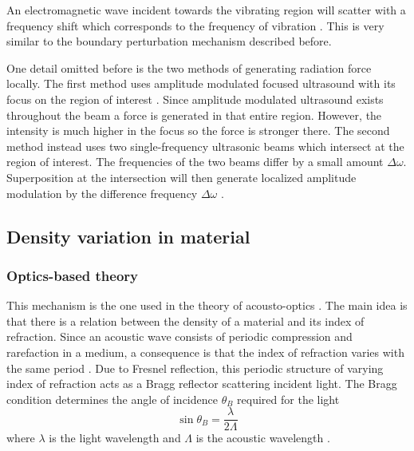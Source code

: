 \documentclass[10pt,a4paper,draft]{scrartcl}
\begin{document}
	An electromagnetic wave incident towards the vibrating region will scatter with a frequency shift which corresponds to the frequency of vibration \cite{Top2014}. This is very similar to the boundary perturbation mechanism described before.
	
	One detail omitted before is the two methods of generating radiation force locally. The first method uses amplitude modulated focused ultrasound with its focus on the region of interest \cite{Top2016}. Since amplitude modulated ultrasound exists throughout the beam a force is generated in that entire region. However, the intensity is much higher in the focus so the force is stronger there. The second method instead uses two single-frequency ultrasonic beams which intersect at the region of interest. The frequencies of the two beams differ by a small amount $\Delta \omega$. Superposition at the intersection will then generate localized amplitude modulation by the difference frequency $\Delta \omega$ \cite{Fatemi1998}.
	
	\subsection{Density variation in material}
	
	\subsubsection{Optics-based theory}
	This mechanism is the one used in the theory of acousto-optics \cite{Saleh2007}\cite{Korpel1981}. The main idea is that there is a relation between the density of a material and its index of refraction. Since an acoustic wave consists of periodic compression and rarefaction in a medium, a consequence is that the index of refraction varies with the same period \cite{Saleh2007}. Due to Fresnel reflection, this periodic structure of varying index of refraction acts as a Bragg reflector scattering incident light. The Bragg condition determines the angle of incidence $\theta_B$ required for the light
	\begin{equation*}
		\sin{\theta_B} = \frac{\lambda}{2\Lambda}
	\end{equation*}
	where $\lambda$ is the light wavelength and $\Lambda$ is the acoustic wavelength \cite{Saleh2007}.
	
\end{document}
